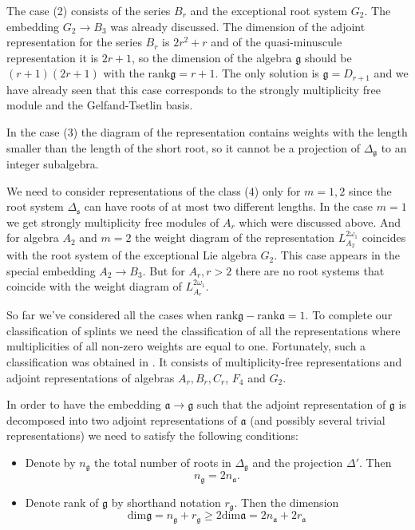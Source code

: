 \documentclass[12pt]{article}
\newcommand{\gf}{\mathfrak{g}}
\newcommand{\af}{\mathfrak{a}}
\newcommand{\sfr}{\mathfrak{s}}
\begin{document}
The case (2) consists of the series $B_{r}$ and the exceptional root system $G_{2}$. The embedding $G_{2}\to
B_{3}$ was already discussed. 
 The dimension of the adjoint representation for the series $B_{r}$
is $2r^{2}+r$ and of the quasi-minuscule representation it is $2r+1$, so the dimension of the algebra
$\gf$ should be $(r+1)(2r+1)$ with the $\mathrm{rank}\gf=r+1$. The only solution is $\gf=D_{r+1}$
and we have already seen that this case corresponds to the strongly multiplicity free module and
the Gelfand-Tsetlin basis.

In the case (3) the diagram of the representation contains weights with the length smaller than the
length of the short root, so it cannot be a projection of $\Delta_{\gf}$ to an integer subalgebra. 

We need to consider representations of the class (4) only for $m=1,2$ since the root system $\Delta_{\sfr}$
can have roots of at most two different lengths. In the case $m=1$ we get strongly multiplicity free
modules of $A_{r}$ which were discussed above. And for algebra $A_{2}$ and $m=2$ the weight diagram
of the representation $L^{2\omega_{1}}_{A_{2}}$ coincides with the root system of the exceptional Lie algebra
$G_{2}$. This case appears in the special embedding $A_{2}\to B_{3}$. But for $A_{r}, r>2$ there are
no root systems that coincide with the weight diagram of $L^{2\omega_{1}}_{A_{r}}$. 

So far we've considered all the cases when $\mathrm{rank}\gf-\mathrm{rank}\af=1$. To complete our
classification of splints we need the classification of all the representations where multiplicities
of all non-zero weights are equal to one. Fortunately, such a classification was obtained in
\cite{plotkin1998visual}. It consists of multiplicity-free representations and adjoint
representations of algebras $A_{r}, B_{r}, C_{r}$, $F_{4}$ and $G_{2}$. 

In order to have the embedding $\af\to \gf$ such that the adjoint representation of $\gf$ is
decomposed into two adjoint representations of $\af$ (and possibly several trivial
representations) we need to satisfy the following conditions:
\begin{itemize}
\item Denote by $n_{\gf}$ the total number of roots in $\Delta_{\gf}$ and the projection $\Delta'$.
  Then
  \begin{equation}
    \label{eq:5}
    n_{\gf}=2n_{\af}.
  \end{equation}
\item Denote rank of $\gf$ by shorthand notation $r_{\gf}$. Then the dimension
  \begin{equation}
    \label{eq:6}
    \mathrm{dim}\gf=n_{\gf}+r_{\gf}\geq 2\mathrm{dim}\af=2n_{\af}+2r_{\af}
  \end{equation}

\end{itemize}
\end{document}

